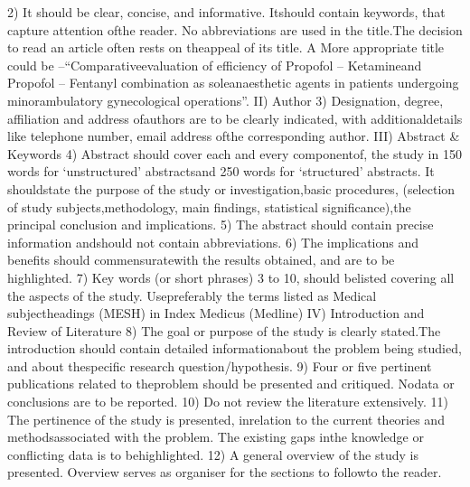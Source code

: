\documentclass{article}
\begin{document}
	2) It should be clear, concise, and informative. Itshould contain keywords, that capture attention ofthe reader. No abbreviations are used in the title.The decision to read an article often  rests on theappeal of its title.      A More appropriate title could be –“Comparativeevaluation of efficiency of Propofol – Ketamineand Propofol – Fentanyl combination as soleanaesthetic agents in patients undergoing minorambulatory  gynecological operations”.
	II) Author
	3) Designation,  degree, affiliation and address ofauthors are to be clearly indicated, with additionaldetails like telephone   number, email  address ofthe corresponding author.
	III) Abstract  & Keywords
	4) Abstract should cover each and every componentof, the study in 150 words for ‘unstructured’ abstractsand 250  words for ‘structured’  abstracts. It shouldstate the purpose of the study or investigation,basic procedures, (selection of study subjects,methodology, main findings, statistical significance),the principal conclusion and implications.
	5) The abstract should contain precise information andshould not contain abbreviations.
	6) The implications and benefits should commensuratewith the results obtained, and are to be highlighted.
	7) Key words (or short phrases) 3 to 10, should belisted covering all the aspects of the study. Usepreferably the terms listed as Medical subjectheadings (MESH) in Index Medicus (Medline)
	IV) Introduction and Review of Literature
	8) The goal or purpose of the study is clearly stated.The introduction should contain detailed informationabout the problem being studied,   and about thespecific research question/hypothesis.
	9) Four or five pertinent publications related to theproblem should be presented and critiqued.  Nodata or conclusions are to be reported.
	10) Do not review the literature  extensively.
	11) The pertinence of the study is  presented,  inrelation to the current theories and methodsassociated with the problem. The existing gaps  inthe knowledge or conflicting data is to behighlighted.
	12) A general overview of the study is presented. Overview serves as   organiser for the sections to followto the reader.
	
\end{document}
